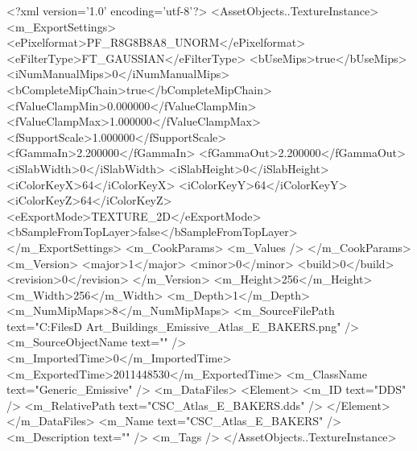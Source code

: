 <?xml version='1.0' encoding='utf-8'?>
<AssetObjects..TextureInstance>
  <m_ExportSettings>
    <ePixelformat>PF_R8G8B8A8_UNORM</ePixelformat>
    <eFilterType>FT_GAUSSIAN</eFilterType>
    <bUseMips>true</bUseMips>
    <iNumManualMips>0</iNumManualMips>
    <bCompleteMipChain>true</bCompleteMipChain>
    <fValueClampMin>0.000000</fValueClampMin>
    <fValueClampMax>1.000000</fValueClampMax>
    <fSupportScale>1.000000</fSupportScale>
    <fGammaIn>2.200000</fGammaIn>
    <fGammaOut>2.200000</fGammaOut>
    <iSlabWidth>0</iSlabWidth>
    <iSlabHeight>0</iSlabHeight>
    <iColorKeyX>64</iColorKeyX>
    <iColorKeyY>64</iColorKeyY>
    <iColorKeyZ>64</iColorKeyZ>
    <eExportMode>TEXTURE_2D</eExportMode>
    <bSampleFromTopLayer>false</bSampleFromTopLayer>
  </m_ExportSettings>
  <m_CookParams>
    <m_Values />
  </m_CookParams>
  <m_Version>
    <major>1</major>
    <minor>0</minor>
    <build>0</build>
    <revision>0</revision>
  </m_Version>
  <m_Height>256</m_Height>
  <m_Width>256</m_Width>
  <m_Depth>1</m_Depth>
  <m_NumMipMaps>8</m_NumMipMaps>
  <m_SourceFilePath text="C:\Users\Shadow\Desktop\Working Files\3D Art\Textures\CSC_Buildings_Emissive\Current\textures\CSC_Atlas_E_BAKERS.png" />
  <m_SourceObjectName text="" />
  <m_ImportedTime>0</m_ImportedTime>
  <m_ExportedTime>2011448530</m_ExportedTime>
  <m_ClassName text="Generic_Emissive" />
  <m_DataFiles>
    <Element>
      <m_ID text="DDS" />
      <m_RelativePath text="CSC_Atlas_E_BAKERS.dds" />
    </Element>
  </m_DataFiles>
  <m_Name text="CSC_Atlas_E_BAKERS" />
  <m_Description text="" />
  <m_Tags />
</AssetObjects..TextureInstance>